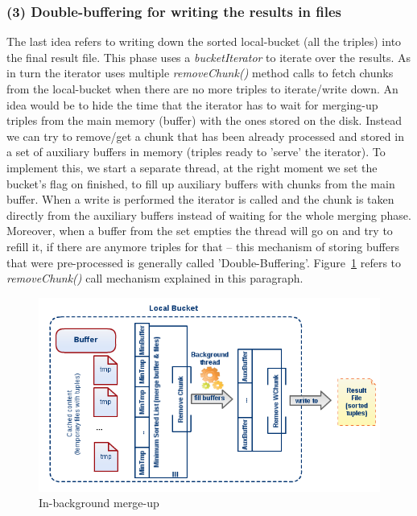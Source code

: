 % 
\subsubsection*{(3) Double-buffering for writing the results in files}

The last idea refers to writing down the sorted local-bucket (all the triples) into the final result file. This phase uses a \textit{bucketIterator} to iterate over the results. As in turn the iterator uses multiple \textit{removeChunk()} method calls to fetch chunks from the local-bucket when there are no more triples to iterate/write down. An idea would be to hide the time that the iterator has to wait for merging-up triples from the main memory (buffer) with the ones stored on the disk. Instead we can try to remove/get a chunk that has been already processed and stored in a set of auxiliary buffers in memory (triples ready to 'serve' the iterator). To implement this, we start a separate thread, at the right moment we set the bucket's flag on finished, to fill up auxiliary buffers with chunks from the main buffer. When a write is performed the iterator is called and the chunk is taken directly from the auxiliary buffers instead of waiting for the whole merging phase. Moreover, when a buffer from the set empties the thread will go on and try to refill it, if there are anymore triples for that -- this mechanism of storing buffers that were pre-processed is generally called 'Double-Buffering'. Figure~\ref{fig:diag5} refers to \textit{removeChunk()} call mechanism explained in this paragraph. 

\begin{figure}
\centering
\includegraphics[scale=0.6]{diag5}
\caption{In-background merge-up}
\label{fig:diag5}
\end{figure}

